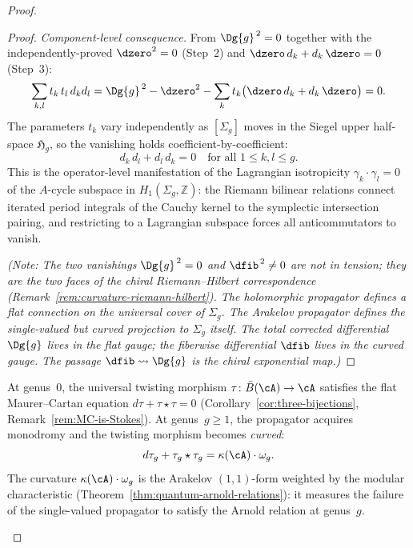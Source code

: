 \begin{proof}
\begin{proof}
\emph{Component-level consequence.}
From $\Dg{g}^{\,2} = 0$ together with the
independently-proved $\dzero^2 = 0$ (Step~2) and
$\dzero\, d_k + d_k\,\dzero = 0$ (Step~3):
\[
  \sum_{k,l} t_k\,t_l\, d_k d_l
  = \Dg{g}^{\,2} - \dzero^2
    - \sum_k t_k\bigl(\dzero\,d_k + d_k\,\dzero\bigr)
  = 0.
\]
The parameters $t_k$ vary independently as
$[\Sigma_g]$ moves in the Siegel upper half-space
$\mathfrak{H}_g$, so the vanishing holds coefficient-by-coefficient:
\[
  d_k\,d_l + d_l\,d_k = 0
  \quad\text{for all } 1 \le k,l \le g.
\]
This is the operator-level manifestation of the Lagrangian
isotropicity $\gamma_k \cdot \gamma_l = 0$
of the $A$-cycle subspace in $H_1(\Sigma_g, \mathbb{Z})$:
the Riemann bilinear relations connect iterated period
integrals of the Cauchy kernel to the symplectic
intersection pairing, and restricting to a Lagrangian
subspace forces all anticommutators to vanish.

\emph{(Note: The two vanishings $\Dg{g}^{\,2} = 0$ and
$\dfib^{\,2} \neq 0$ are not in tension; they are the two
faces of the chiral Riemann--Hilbert correspondence
(Remark~\textup{\ref{rem:curvature-riemann-hilbert}}).
The holomorphic propagator defines a flat connection on
the universal cover of $\Sigma_g$.  The Arakelov
propagator defines the single-valued but curved
projection to $\Sigma_g$ itself.  The total corrected
differential $\Dg{g}$ lives in the flat gauge; the
fiberwise differential $\dfib$ lives in the curved gauge.
The passage $\dfib \leadsto \Dg{g}$ is the chiral
exponential map.)} \qedhere
\end{proof}

\begin{remark}
\label{rem:curved-twisting-higher-genus}
At genus~$0$, the universal twisting morphism
$\tau\colon \bar{B}(\cA) \to \cA$ satisfies the flat
Maurer--Cartan equation $d\tau + \tau \star \tau = 0$
(Corollary~\ref{cor:three-bijections},
Remark~\ref{rem:MC-is-Stokes}).
At genus~$g \geq 1$, the propagator acquires monodromy and the
twisting morphism becomes \emph{curved}:
\begin{equation}\label{eq:curved-MC-higher-genus}
d\tau_g + \tau_g \star \tau_g = \kappa(\cA) \cdot \omega_g.
\end{equation}
The curvature $\kappa(\cA) \cdot \omega_g$ is the Arakelov
$(1,1)$-form weighted by the modular characteristic
(Theorem~\ref{thm:quantum-arnold-relations}): it measures
the failure of the single-valued propagator to satisfy the
Arnold relation at genus~$g$.


\end{remark}
\end{proof}
